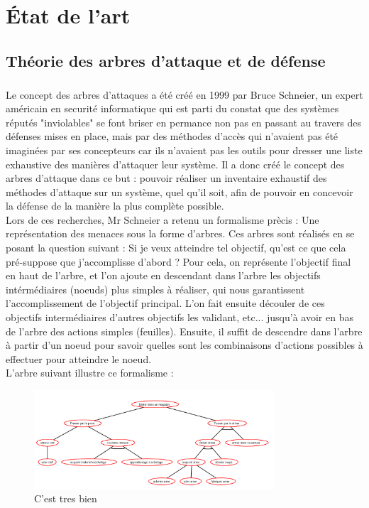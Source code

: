 \chapter{\'Etat de l'art}
	\section{Théorie des arbres d'attaque et de défense}
		\paragraph{}
		Le concept des arbres d'attaques a été créé en 1999 par Bruce Schneier, un expert américain en securité informatique qui est parti du constat que des systèmes réputés "inviolables" se font briser en permance non pas en passant au travers des défenses mises en place, mais par des méthodes d'accès qui n'avaient pas été imaginées par ses concepteurs car ils n'avaient pas les outils pour dresser une liste exhaustive des manières d'attaquer leur système. Il a donc créé le concept des arbres d'attaque dans ce but : pouvoir réaliser un inventaire exhaustif des méthodes d'attaque sur un système, quel qu'il soit, afin de pouvoir en concevoir la défense de la manière la plus complète possible.\\

		Lors de ces recherches, Mr Schneier a retenu un formalisme prècis : Une représentation des menaces sous la forme d'arbres. Ces arbres sont réalisés en se posant la question suivant : Si je veux atteindre tel objectif, qu'est ce que cela pré-suppose que j'accomplisse d'abord ? Pour cela, on représente l'objectif final en haut de l'arbre, et l'on ajoute en descendant dans l'arbre les objectifs intérmédiaires (noeuds) plus simples à réaliser, qui nous garantissent l'accomplissement de l'objectif principal. L'on fait ensuite découler de ces objectifs intermédiaires d'autres objectifs les validant, etc... jusqu'à avoir en bas de l'arbre des actions simples (feuilles). Ensuite, il suffit de descendre dans l'arbre à partir d'un noeud pour savoir quelles sont les combinaisons d'actions possibles à effectuer pour atteindre le noeud.\\ 

		L'arbre suivant illustre ce formalisme : 

		\begin{figure}
			\begin{center}
				\includegraphics[width=0.8\textwidth]{figure/Entrer_dans_un_magasin.png}
			\end{center}
			\caption{C'est tres bien}
			\label{fig:arbre_example_1}
		\end{figure}


